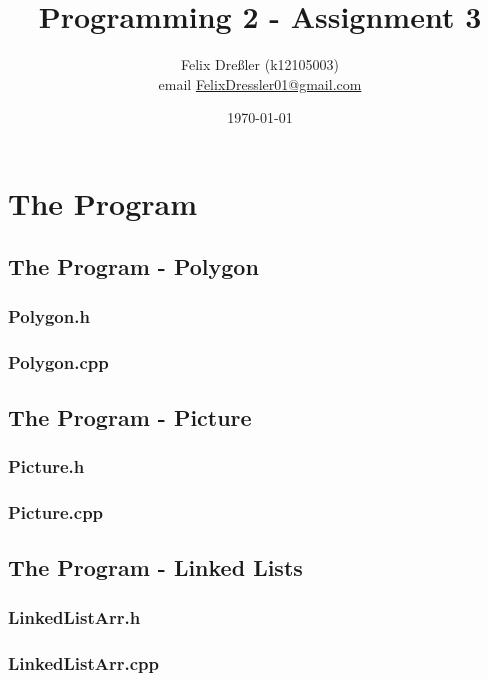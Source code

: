 \documentclass[11pt,titlepage]{article}
\title{Programming 2 - Assignment 3}
\author{Felix Dreßler (k12105003)\\ email \href{mailto:FelixDressler01@gmail.com}{FelixDressler01@gmail.com}}
\date{\today} %
\begin{document}
\maketitle
	\section{The Program}
	

		\subsection{The Program - Polygon}
			\subsubsection{Polygon.h}
				
				
			\subsubsection{Polygon.cpp}
				
		
		\subsection{The Program - Picture}
			\subsubsection{Picture.h}
				
			
			\subsubsection{Picture.cpp}
				
		
		\subsection{The Program - Linked Lists}
			\subsubsection{LinkedListArr.h}
				
			
			\subsubsection{LinkedListArr.cpp}
				
			
\end{document}

